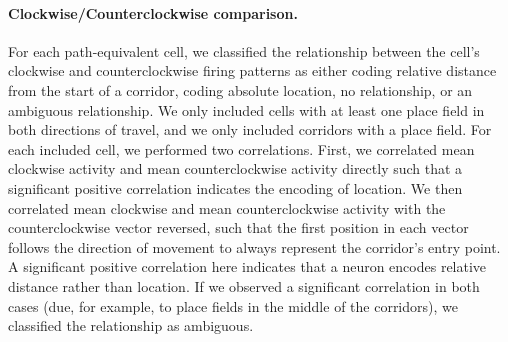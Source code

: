 \paragraph{Clockwise/Counterclockwise comparison.} For each path-equivalent cell, we classified the relationship between the cell's clockwise and counterclockwise firing patterns as either coding relative distance from the start of a corridor, coding absolute location, no relationship, or an ambiguous relationship. We only included cells with at least one place field in both directions of travel, and we only included corridors with  a place field. For each included cell, we performed two correlations. First, we correlated mean clockwise activity and mean counterclockwise activity directly such that a significant positive correlation indicates the encoding of location. We then correlated mean clockwise and mean counterclockwise activity with the counterclockwise vector  reversed, such that the first position in each vector follows the direction of movement to always represent the corridor's entry point. A significant positive correlation here indicates that a neuron encodes relative distance rather than location. If we observed a significant correlation in both cases (due, for example, to place fields in the middle of the corridors), we classified the relationship as ambiguous.





 